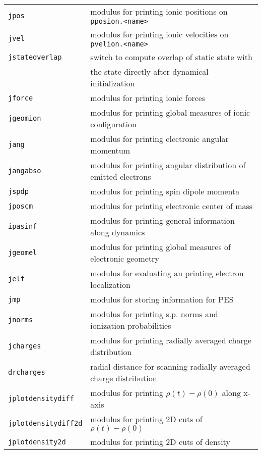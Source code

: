 \documentclass[12pt]{article}
\begin{document}
\begin{tabular}{ll}
\\
{\tt jpos}           & modulus for printing ionic positions on {\tt pposion.<name>}
\\
{\tt jvel}           & modulus for printing ionic velocities on {\tt pvelion.<name>}
\\
{\tt jstateoverlap}  & switch to compute overlap of static state
                       with\\
                     & the state directly after dynamical
                       initialization
\\
{\tt jforce} & modulus for printing ionic forces \\
{\tt jgeomion} &  modulus for printing global measures of ionic configuration \\
{\tt jang} & modulus for printing electronic angular momentum  \\
{\tt jangabso} &  modulus for printing angular distribution of emitted
electrons\\
{\tt jspdp} &  modulus for printing spin dipole momenta \\
{\tt jposcm} &  modulus for printing electronic center of mass \\
{\tt ipasinf} &  modulus for printing general information along dynamics\\
{\tt jgeomel} &   modulus for printing global measures of electronic geometry \\
{\tt jelf} &  modulus for evaluating an printing electron localization\\
{\tt jmp} & modulus for storing information for PES \\
{\tt jnorms} & modulus for printing s.p. norms and ionization probabilities \\
{\tt jcharges} & modulus for printing radially averaged charge distribution \\
{\tt drcharges} & radial distance for scanning radially averaged charge distribution \\
{\tt jplotdensitydiff} &  modulus for printing $\rho(t)-\rho(0)$ along
x-axis\\
{\tt jplotdensitydiff2d} &   modulus for printing 2D cuts of $\rho(t)-\rho(0)$ \\
{\tt jplotdensity2d} &  modulus for printing 2D cuts of density  \\
\hline
\end{tabular}
\end{document}
